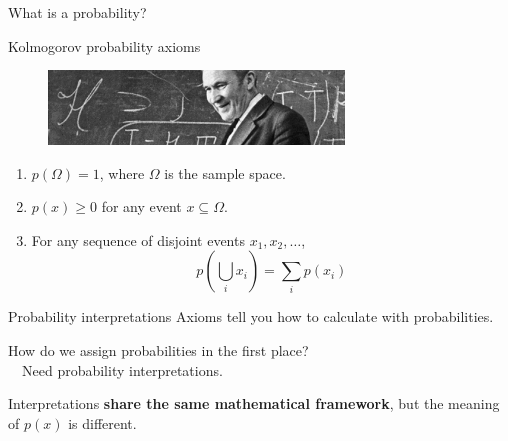 \documentclass[
aspectratio=169,
14pt,
professionalfonts
]{beamer}
\newcommand{\arrow}{~\ding{220}~}
\begin{document}
\begin{frame}
\centering
\Large
What is a probability?
\end{frame}

\begin{frame}{Kolmogorov probability axioms}
\begin{figure}
    \centering
    \includegraphics[width=0.7\textwidth]{../plots/kolmogorov.jpg}
\end{figure}
\begin{enumerate}
  \item $ p(\Omega) = 1 $, where \( \Omega \) is the sample space.
  \item $ p(x) \geq 0 $ for any event \( x \subseteq \Omega \).
  \item For any sequence of disjoint events \( x_1, x_2, \dots \),
        $$
        p\left( \bigcup_{i} x_i \right) = \sum_{i} p(x_i)
        $$
\end{enumerate}
\end{frame}




\begin{frame}{Probability interpretations}
    Axioms tell you how to calculate with probabilities.
    
    \vspace{0.5cm}
    How do we assign probabilities in the first place? \\
    \arrow Need probability interpretations.

    \vspace{0.5cm}
    Interpretations \textbf{share the same mathematical framework}, but the meaning of $p(x)$ is different.
\end{frame}
\end{document}
